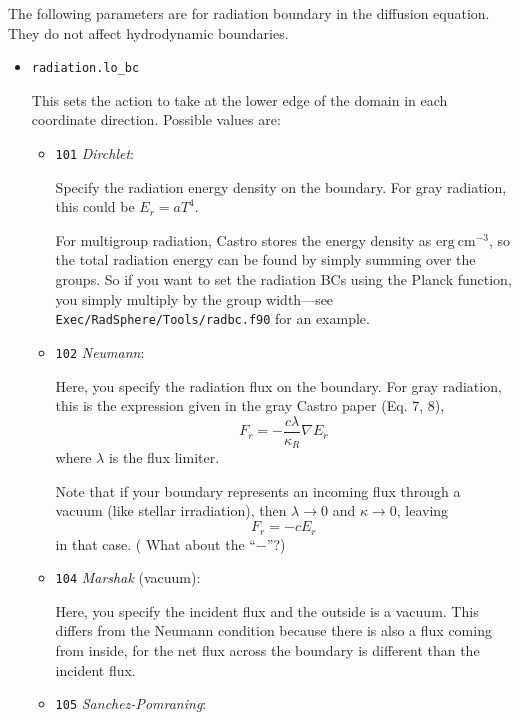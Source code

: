 \documentclass[11pt,letterpaper]{article}
\begin{document}
The following parameters are for radiation boundary in the diffusion
equation. They do not affect hydrodynamic boundaries.
\begin{itemize}
\item {\tt radiation.lo\_bc}
  
  This sets the action to take at the lower edge of the domain in
  each coordinate direction.  Possible values are:
  \begin{itemize}

  \item {\tt 101} {\em Dirchlet}:

    Specify the radiation energy density on the boundary.
    For gray radiation, this could be $E_r = a T^4$.

    For multigroup radiation, Castro stores the energy density as
    $\mathrm{erg}~\mathrm{cm}^{-3}$, so the total radiation energy
    can be found by simply summing over the groups.  So if you want
    to set the radiation BCs using the Planck function, you simply
    multiply by the group width---see {\tt Exec/RadSphere/Tools/radbc.f90}
    for an example.

  \item {\tt 102} {\em Neumann}:

    Here, you specify the radiation flux on the boundary.  For gray
    radiation, this is the expression given in the gray Castro paper
    (Eq. 7, 8),
    \begin{equation}
      F_r = - \frac{c\lambda}{\kappa_R} \nabla E_r
    \end{equation}
    where $\lambda$ is the flux limiter.

    Note that if your boundary represents an incoming flux through
    a vacuum (like stellar irradiation), then $\lambda \rightarrow 0$
    and $\kappa \rightarrow 0$, leaving
    \begin{equation}
      F_r = -c E_r
    \end{equation}
    in that case.  ({\color{red} What about the ``$-$''?})

  \item {\tt 104} {\em Marshak} (vacuum):
      
    Here, you specify the incident flux and the outside is a vacuum.
    This differs from the Neumann condition because there is also a
    flux coming from inside, for the net flux across the boundary is
    different than the incident flux.

  \item {\tt 105} {\em Sanchez-Pomraning}:


\end{itemize}
\end{itemize}
\end{document}
